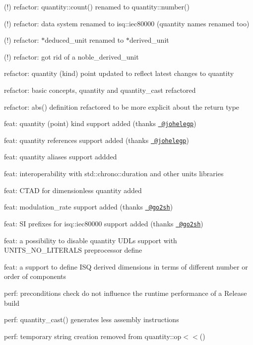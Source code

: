\begin{DoxyItemize}
\begin{DoxyItemize}
\item (!) refactor\+: {\ttfamily quantity\+::count()} renamed to {\ttfamily quantity\+::number()}
\item (!) refactor\+: {\ttfamily data} system renamed to {\ttfamily isq\+::iec80000} (quantity names renamed too)
\item (!) refactor\+: {\ttfamily $\ast$deduced\+\_\+unit} renamed to {\ttfamily $\ast$derived\+\_\+unit}
\item (!) refactor\+: got rid of a {\ttfamily noble\+\_\+derived\+\_\+unit}
\item refactor\+: quantity (kind) point updated to reflect latest changes to {\ttfamily quantity}
\item refactor\+: basic concepts, {\ttfamily quantity} and {\ttfamily quantity\+\_\+cast} refactored
\item refactor\+: {\ttfamily abs()} definition refactored to be more explicit about the return type
\item feat\+: quantity (point) kind support added (thanks \href{https://github.com/johelegp}{\texttt{ @johelegp}})
\item feat\+: quantity references support added (thanks \href{https://github.com/johelegp}{\texttt{ @johelegp}})
\item feat\+: quantity aliases support addded
\item feat\+: interoperability with {\ttfamily std\+::chrono\+::duration} and other units libraries
\item feat\+: CTAD for dimensionless quantity added
\item feat\+: {\ttfamily modulation\+\_\+rate} support added (thanks \href{https://github.com/go2sh}{\texttt{ @go2sh}})
\item feat\+: SI prefixes for {\ttfamily isq\+::iec80000} support added (thanks \href{https://github.com/go2sh}{\texttt{ @go2sh}})
\item feat\+: a possibility to disable quantity UDLs support with {\ttfamily UNITS\+\_\+\+NO\+\_\+\+LITERALS} preprocessor define
\item feat\+: a support to define ISQ derived dimensions in terms of different number or order of components
\item perf\+: preconditions check do not influence the runtime performance of a Release build
\item perf\+: {\ttfamily quantity\+\_\+cast()} generates less assembly instructions
\item perf\+: temporary string creation removed from {\ttfamily quantity\+::op\texorpdfstring{$<$}{<}\texorpdfstring{$<$}{<}()}

\end{DoxyItemize}
\end{DoxyItemize}
